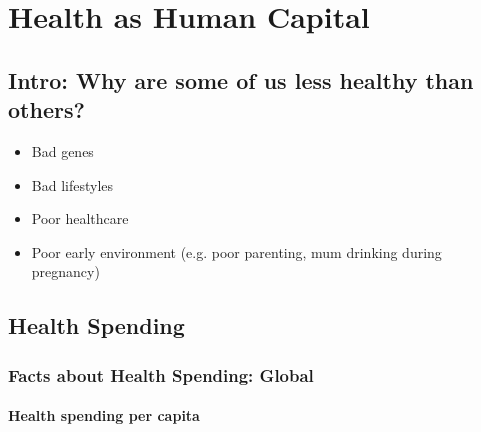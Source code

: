 \chapter{Health as Human Capital}


\section{Intro: Why are some of us less healthy than others?}

    \begin{itemize}
        \item Bad genes
        \item Bad lifestyles
        \item Poor healthcare 
        \item Poor early environment 
        (e.g. poor parenting, mum drinking during pregnancy)
   \end{itemize}    

\section{Health Spending}

    \subsection{Facts about Health Spending: Global}

        \subsubsection{Health spending per capita}


